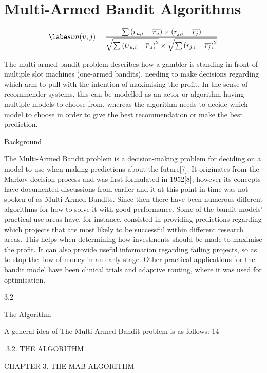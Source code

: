 \chapter{Multi-Armed Bandit Algorithms}

\[
\labe

sim(u, j) = \frac{\sum \left ( r_{u,i} - \overline{r_{u}} \right ) \times \left ( r_{j,i} - \overline{r_{j}} \right )}{\sqrt{\sum \left ( U_{u, i} - \overline{r}_{u} \right )^{2}}\times \sqrt{\sum \left ( r_{j,i} - \overline{r_{j}} \right )^{2}}}

\]

The multi-armed bandit problem describes how a gambler is standing in front of multiple slot machines (one-armed bandits), needing to make decisions regarding which arm to pull with the intention of maximising the profit.
In the sense of recommender systems, this can be modelled as an actor or algorithm having multiple models to choose from, whereas the algorithm needs to decide which model to choose in order to give the best recommendation or make the best prediction.

Background

The Multi-Armed Bandit problem is a decision-making problem for deciding on a model
to use when making predictions about the future[7]. It originates from the Markov decision process and was first formulated in 1952[8], however its concepts have documented
discussions from earlier and it at this point in time was not spoken of as Multi-Armed
Bandits. Since then there have been numerous different algorithms for how to solve it
with good performance.
Some of the bandit models’ practical use-areas have, for instance, consisted in providing
predictions regarding which projects that are most likely to be successful within different
research areas. This helps when determining how investments should be made to maximise the profit. It can also provide useful information regarding failing projects, so as
to stop the flow of money in an early stage. Other practical applications for the bandit
model have been clinical trials and adaptive routing, where it was used for optimisation.

3.2

The Algorithm

A general idea of The Multi-Armed Bandit problem is as follows:
14

3.2. THE ALGORITHM

CHAPTER 3. THE MAB ALGORITHM

